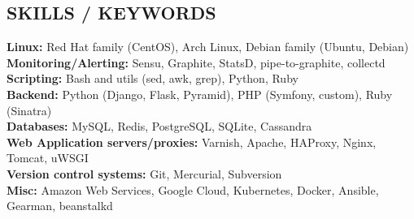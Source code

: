 \documentclass[margin,line]{resume}
\begin{document}
\begin{resume}
    \section{\mysidestyle \textbf{\large{S}\small{KILLS} / \large{K}\small{EYWORDS}}}

    \textbf{Linux:} Red Hat family (CentOS), Arch Linux, Debian family (Ubuntu, Debian)\\
    \textbf{Monitoring/Alerting:} Sensu, Graphite, StatsD, pipe-to-graphite, collectd\\
    \textbf{Scripting:} Bash and utils (sed, awk, grep), Python, Ruby\\
    \textbf{Backend:} Python (Django, Flask, Pyramid), PHP (Symfony, custom), Ruby (Sinatra)\\
    \textbf{Databases:} MySQL, Redis, PostgreSQL, SQLite, Cassandra\\
    \textbf{Web Application servers/proxies:} Varnish, Apache, HAProxy, Nginx, Tomcat, uWSGI\\
    \textbf{Version control systems:} Git, Mercurial, Subversion\\
    \textbf{Misc:} Amazon Web Services, Google Cloud, Kubernetes, Docker, Ansible, Gearman, beanstalkd


\end{resume}
\end{document}
